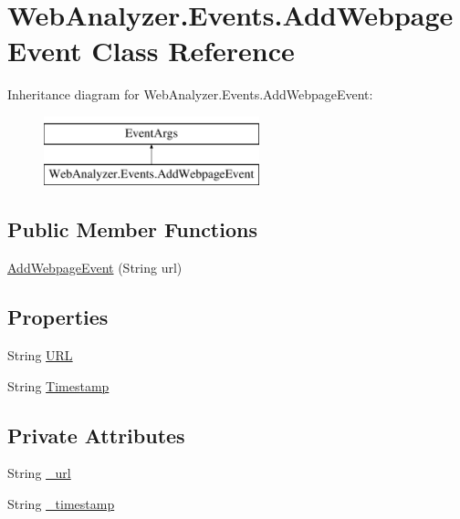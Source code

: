 \hypertarget{class_web_analyzer_1_1_events_1_1_add_webpage_event}{}\section{Web\+Analyzer.\+Events.\+Add\+Webpage\+Event Class Reference}
\label{class_web_analyzer_1_1_events_1_1_add_webpage_event}
Inheritance diagram for Web\+Analyzer.\+Events.\+Add\+Webpage\+Event\+:\begin{figure}[H]
\begin{center}
\leavevmode
\includegraphics[height=2.000000cm]{class_web_analyzer_1_1_events_1_1_add_webpage_event}
\end{center}
\end{figure}
\subsection*{Public Member Functions}
\begin{DoxyCompactItemize}
\item 
\hyperlink{class_web_analyzer_1_1_events_1_1_add_webpage_event_a4dd428922290cbedfb8de491a66c89ef}{Add\+Webpage\+Event} (String url)
\end{DoxyCompactItemize}
\subsection*{Properties}
\begin{DoxyCompactItemize}
\item 
String \hyperlink{class_web_analyzer_1_1_events_1_1_add_webpage_event_a81c2419e44f174687def7a813525fe00}{U\+R\+L}
\item 
String \hyperlink{class_web_analyzer_1_1_events_1_1_add_webpage_event_a4d534a36b31fcd6ee317a7d214b31ba7}{Timestamp}
\end{DoxyCompactItemize}
\subsection*{Private Attributes}
\begin{DoxyCompactItemize}
\item 
String \hyperlink{class_web_analyzer_1_1_events_1_1_add_webpage_event_a514a144e2cc984ecec6593547732c55f}{\+\_\+url}
\item 
String \hyperlink{class_web_analyzer_1_1_events_1_1_add_webpage_event_a6e60058cdea0a0ac86687e1a50eae2ed}{\+\_\+timestamp}
\end{DoxyCompactItemize}


